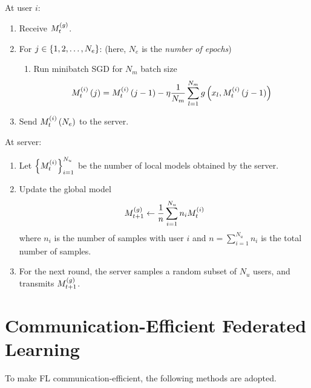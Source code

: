 \documentclass[twoside]{article}
\begin{document}
At user \(i\):

\begin{enumerate}
    \item Receive \(M_t^{\left(g\right)}\).
    \item For \(j \in \left\{1,2,\ldots,N_e\right\}\):
    (here, \(N_e\) is the \emph{number of epochs})
    \begin{enumerate}
        \item Run minibatch SGD for \(N_m\) batch size
        \begin{equation}
            M_t^{\left(i\right)}\left(j\right) = M_t^{\left(i\right)}\left(j-1\right) - \eta\frac{1}{N_m}\sum_{l=1}^{N_m}g\left(x_l,M_t^{\left(i\right)}\left(j-1\right)\right)
            \label{eq:sgd-update}
        \end{equation}
    \end{enumerate}
    \item Send \(M_t^{\left(i\right)}\left(N_e\right)\) to the server.
\end{enumerate}

At server:

\begin{enumerate}
    \item Let \(\left\{M_t^{\left(i\right)}\right\}_{i=1}^{N_u}\) be the number of local
    models obtained by the server.
    \item Update the global model
    \begin{equation}
        M_{t+1}^{\left(g\right)} \leftarrow \frac{1}{n}\sum_{i=1}^{N_u}n_iM_t^{\left(i\right)}
        \label{eq:sgd-server-update}
    \end{equation}
    where \(n_i\) is the number of samples with user \(i\) and \(n = 
    \sum_{i=1}^{N_u}n_i\) is the total number of samples.
    \item For the next round, the server samples a random subset of \(N_u\) 
    users, and transmits \(M_{t+1}^{\left(g\right)}\).
\end{enumerate}

\section{Communication-Efficient Federated Learning}

To make FL communication-efficient, the following methods are adopted.
\end{document}
